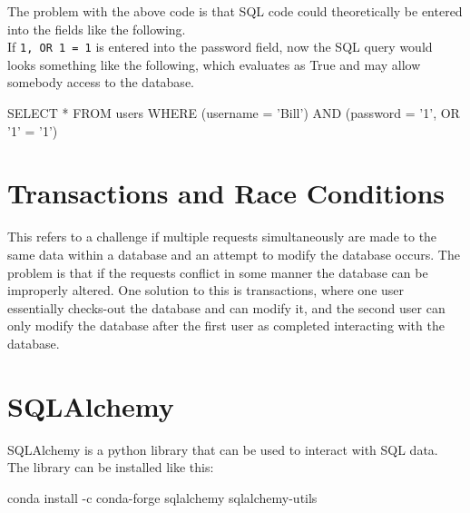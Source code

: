 \documentclass[]{book}
\newenvironment{Shaded}{\begin{snugshade}}{\end{snugshade}}
\newcommand{\ExtensionTok}[1]{#1}
\newcommand{\NormalTok}[1]{#1}
\newcommand{\StringTok}[1]{\textcolor[rgb]{0.31,0.60,0.02}{#1}}
\begin{document}
The problem with the above code is that SQL code could theoretically be entered into the fields like the following.\\
If \texttt{1\textquotesingle{},\ OR\ \textquotesingle{}1\textquotesingle{}\ =\ \textquotesingle{}1\textquotesingle{}} is entered into the password field, now the SQL query would looks something like the following, which evaluates as True and may allow somebody access to the database.

\begin{Shaded}
\begin{Highlighting}[]
\ExtensionTok{SELECT}\NormalTok{ * FROM users WHERE (username = }\StringTok{'Bill'}\NormalTok{) }\ExtensionTok{AND}\NormalTok{ (password = }\StringTok{'1'}\NormalTok{, OR }\StringTok{'1'}\NormalTok{ = }\StringTok{'1'}\NormalTok{)}
\end{Highlighting}
\end{Shaded}

\hypertarget{transactions-and-race-conditions}{%
\section{Transactions and Race Conditions}\label{transactions-and-race-conditions}}

This refers to a challenge if multiple requests simultaneously are made to the same data within a database and an attempt to modify the database occurs. The problem is that if the requests conflict in some manner the database can be improperly altered. One solution to this is transactions, where one user essentially checks-out the database and can modify it, and the second user can only modify the database after the first user as completed interacting with the database.

\hypertarget{sqlalchemy}{%
\section{SQLAlchemy}\label{sqlalchemy}}

SQLAlchemy is a python library that can be used to interact with SQL data.\\
The library can be installed like this:

\begin{Shaded}
\begin{Highlighting}[]
\ExtensionTok{conda}\NormalTok{ install -c conda-forge sqlalchemy sqlalchemy-utils}
\end{Highlighting}
\end{Shaded}
\end{document}
